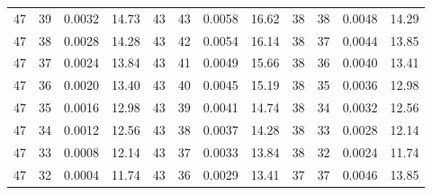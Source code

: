 \begin{tabular}{llll|llll|llll}
47 & 39 & 0.0032 & 14.73 & 43 & 43 & 0.0058 & 16.62 & 38 & 38 & 0.0048 & 14.29\\
47 & 38 & 0.0028 & 14.28 & 43 & 42 & 0.0054 & 16.14 & 38 & 37 & 0.0044 & 13.85\\
47 & 37 & 0.0024 & 13.84 & 43 & 41 & 0.0049 & 15.66 & 38 & 36 & 0.0040 & 13.41\\
47 & 36 & 0.0020 & 13.40 & 43 & 40 & 0.0045 & 15.19 & 38 & 35 & 0.0036 & 12.98\\
47 & 35 & 0.0016 & 12.98 & 43 & 39 & 0.0041 & 14.74 & 38 & 34 & 0.0032 & 12.56\\
47 & 34 & 0.0012 & 12.56 & 43 & 38 & 0.0037 & 14.28 & 38 & 33 & 0.0028 & 12.14\\
47 & 33 & 0.0008 & 12.14 & 43 & 37 & 0.0033 & 13.84 & 38 & 32 & 0.0024 & 11.74\\
47 & 32 & 0.0004 & 11.74 & 43 & 36 & 0.0029 & 13.41 & 37 & 37 & 0.0046 & 13.85\\
\bottomrule
\end{tabular}
\newpage
